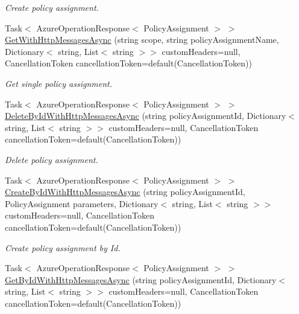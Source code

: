 \begin{DoxyCompactItemize}
\begin{DoxyCompactList}\small\item\em Create policy assignment. \end{DoxyCompactList}\item 
Task$<$ Azure\+Operation\+Response$<$ Policy\+Assignment $>$ $>$ \hyperlink{interface_microsoft_1_1_azure_1_1_management_1_1_resources_1_1_i_policy_assignments_operations_a75de99e9c5dc9a64d16aa99ce4f58dda}{Get\+With\+Http\+Messages\+Async} (string scope, string policy\+Assignment\+Name, Dictionary$<$ string, List$<$ string $>$$>$ custom\+Headers=null, Cancellation\+Token cancellation\+Token=default(Cancellation\+Token))
\begin{DoxyCompactList}\small\item\em Get single policy assignment. \end{DoxyCompactList}\item 
Task$<$ Azure\+Operation\+Response$<$ Policy\+Assignment $>$ $>$ \hyperlink{interface_microsoft_1_1_azure_1_1_management_1_1_resources_1_1_i_policy_assignments_operations_a3646b0b946a87c56ea3dda3fa082d2f2}{Delete\+By\+Id\+With\+Http\+Messages\+Async} (string policy\+Assignment\+Id, Dictionary$<$ string, List$<$ string $>$$>$ custom\+Headers=null, Cancellation\+Token cancellation\+Token=default(Cancellation\+Token))
\begin{DoxyCompactList}\small\item\em Delete policy assignment. \end{DoxyCompactList}\item 
Task$<$ Azure\+Operation\+Response$<$ Policy\+Assignment $>$ $>$ \hyperlink{interface_microsoft_1_1_azure_1_1_management_1_1_resources_1_1_i_policy_assignments_operations_af2cdc3237a0d81ed00d9cf69f3b19896}{Create\+By\+Id\+With\+Http\+Messages\+Async} (string policy\+Assignment\+Id, Policy\+Assignment parameters, Dictionary$<$ string, List$<$ string $>$$>$ custom\+Headers=null, Cancellation\+Token cancellation\+Token=default(Cancellation\+Token))
\begin{DoxyCompactList}\small\item\em Create policy assignment by Id. \end{DoxyCompactList}\item 
Task$<$ Azure\+Operation\+Response$<$ Policy\+Assignment $>$ $>$ \hyperlink{interface_microsoft_1_1_azure_1_1_management_1_1_resources_1_1_i_policy_assignments_operations_a25e2df3e7f2bde5a520c957ed6cad657}{Get\+By\+Id\+With\+Http\+Messages\+Async} (string policy\+Assignment\+Id, Dictionary$<$ string, List$<$ string $>$$>$ custom\+Headers=null, Cancellation\+Token cancellation\+Token=default(Cancellation\+Token))

\end{DoxyCompactItemize}
